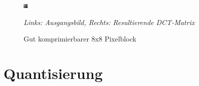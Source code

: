 \begin{figure}[h!]
    \centering
    \begin{multicols}{2}
    \includegraphics[scale=15]{images/2-2_dct_good.png}
    
    \end{multicols}
    \caption{Gut komprimierbarer 8x8 Pixelblock}
    \textit{Links: Ausgangsbild, Rechts: Resultierende DCT-Matrix}
    \label{fig:dct-good}
\end{figure}


\section{Quantisierung}
